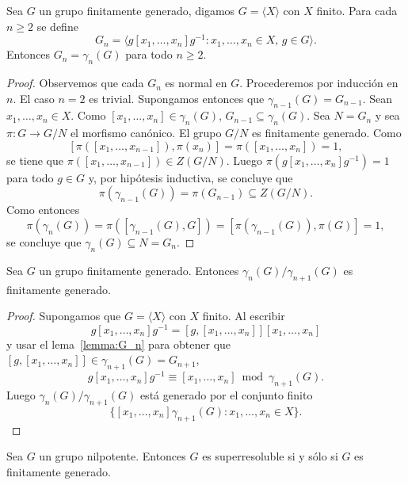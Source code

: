 \begin{lemma}
	\label{lemma:G_n}
	Sea $G$ un grupo finitamente generado, digamos $G=\langle X\rangle$ con $X$
	finito. Para cada $n\geq2$ se define
	\[
		G_n=\langle g[x_1,\dots,x_n]g^{-1}:x_1,\dots,x_n\in X,\,g\in G\rangle.
	\]
	Entonces $G_n=\gamma_n(G)$ para todo $n\geq2$. 
\end{lemma}

\begin{proof}
	Observemos que cada $G_n$ es normal en $G$.  Procederemos por inducción en
	$n$. El caso $n=2$ es trivial. Supongamos entonces que
	$\gamma_{n-1}(G)=G_{n-1}$. Sean $x_1,\dots,x_n\in X$. Como
	$[x_1,\dots,x_n]\in\gamma_{n}(G)$, $G_{n-1}\subseteq\gamma_n(G)$. Sea
	$N=G_n$ y sea $\pi\colon G\to G/N$ el morfismo canónico. El grupo $G/N$ es
	finitamente generado. Como
	\[
	[\pi([x_1,\dots,x_{n-1}]),\pi(x_n)]=\pi([x_1,\dots,x_n])=1,
	\]
	se tiene que $\pi([x_1,\dots,x_{n-1}])\in Z(G/N)$. Luego
	$\pi(g[x_1,\dots,x_n]g^{-1})=1$ para todo $g\in G$ y, por hipótesis
	inductiva, 
	se concluye que 
	\[
	\pi(\gamma_{n-1}(G))=\pi(G_{n-1})\subseteq Z(G/N).
	\]
	Como entonces 
	\[
	\pi(\gamma_{n}(G))=\pi([\gamma_{n-1}(G),G])=[\pi(\gamma_{n-1}(G)),\pi(G)]=1,
	\]
	se concluye que $\gamma_n(G)\subseteq N=G_n$.
\end{proof}

\begin{lemma}
	\label{lemma:gamma_n/gamma_n+1}
	Sea $G$ un grupo finitamente generado.  Entonces
	$\gamma_n(G)/\gamma_{n+1}(G)$ es finitamente generado. 
\end{lemma}

\begin{proof}
	Supongamos que $G=\langle X\rangle$ con $X$ finito. 
	Al escribir 
	\[
	g[x_1,\dots,x_n]g^{-1}=[g,[x_1,\dots,x_n]][x_1,\dots,x_n]
	\]
	y usar el lema~\ref{lemma:G_n} para obtener 
	que $[g,[x_1,\dots,x_n]]\in \gamma_{n+1}(G)=G_{n+1}$, 
	\[
	g[x_1,\dots,x_n]g^{-1}\equiv [x_1,\dots,x_n]\bmod \gamma_{n+1}(G). 
	\]
	Luego $\gamma_{n}(G)/\gamma_{n+1}(G)$ está generado por 
	el conjunto finito 
	\[
	\{[x_1,\dots,x_n]\gamma_{n+1}(G):x_1,\dots,x_n\in X\}. 
	\]
\end{proof}

\begin{theorem}
	\label{theorem:super=fg}
	Sea $G$ un grupo nilpotente. Entonces $G$ es superresoluble si y sólo si
	$G$ es finitamente generado.
\end{theorem}

